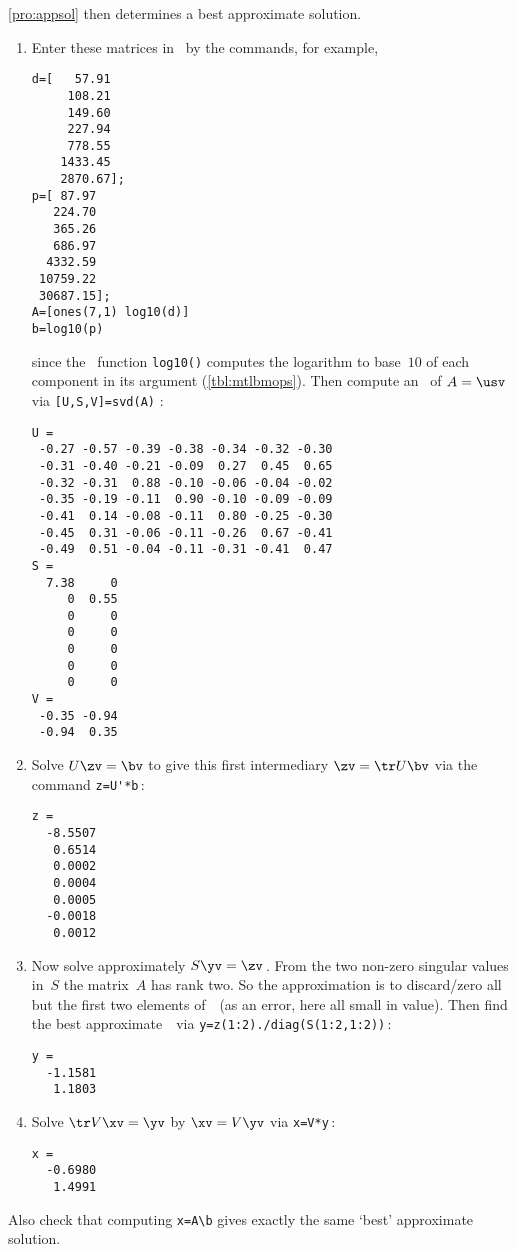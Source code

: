\begin{example}
\begin{solution}
\autoref{pro:appsol} then determines a best approximate solution.
\begin{enumerate}
\item Enter these matrices in \script\ by the commands, for example,
\setbox\ajrqrbox\hbox{}%
\marginpar{\usebox{\ajrqrbox\\[2ex]}}%
\begin{verbatim}
d=[   57.91
     108.21
     149.60
     227.94
     778.55
    1433.45
    2870.67];
p=[ 87.97
   224.70
   365.26
   686.97
  4332.59
 10759.22
 30687.15];
A=[ones(7,1) log10(d)]
b=log10(p)
\end{verbatim}
since the \script\ function \verb|log10()| computes the logarithm to base~\(10\) of each component in its argument (\autoref{tbl:mtlbmops}).
Then compute an \svd\ of \(A=\usv\) via \verb|[U,S,V]=svd(A)| \twodp:
\begin{verbatim}
U =
 -0.27 -0.57 -0.39 -0.38 -0.34 -0.32 -0.30
 -0.31 -0.40 -0.21 -0.09  0.27  0.45  0.65
 -0.32 -0.31  0.88 -0.10 -0.06 -0.04 -0.02
 -0.35 -0.19 -0.11  0.90 -0.10 -0.09 -0.09
 -0.41  0.14 -0.08 -0.11  0.80 -0.25 -0.30
 -0.45  0.31 -0.06 -0.11 -0.26  0.67 -0.41
 -0.49  0.51 -0.04 -0.11 -0.31 -0.41  0.47
S =
  7.38     0
     0  0.55
     0     0
     0     0
     0     0
     0     0
     0     0
V =
 -0.35 -0.94
 -0.94  0.35
\end{verbatim}
\item Solve \(U\zv=\bv\) to give this first intermediary \(\zv=\tr U\bv\) via the command \verb|z=U'*b|\,:
\begin{verbatim}
z =
  -8.5507
   0.6514
   0.0002
   0.0004
   0.0005
  -0.0018
   0.0012
\end{verbatim}

\item Now solve approximately \(S\yv=\zv\)\,. 
From the two non-zero singular values in~\(S\) the matrix~\(A\) has rank two.
So the approximation is to discard\slash zero all but the first two elements of~\zv\ (as an error, here all small in value).
Then find the best approximate~\yv\ via \verb|y=z(1:2)./diag(S(1:2,1:2))|\,:
\begin{verbatim}
y =
  -1.1581
   1.1803
\end{verbatim}

\item Solve \(\tr V\xv=\yv\) by \(\xv=V\yv\) via \verb|x=V*y|\,:
\begin{verbatim}
x =
  -0.6980
   1.4991
\end{verbatim}
\end{enumerate}
Also check that computing \verb|x=A\b| gives exactly the same `best' approximate solution. 


\end{solution}
\end{example}
